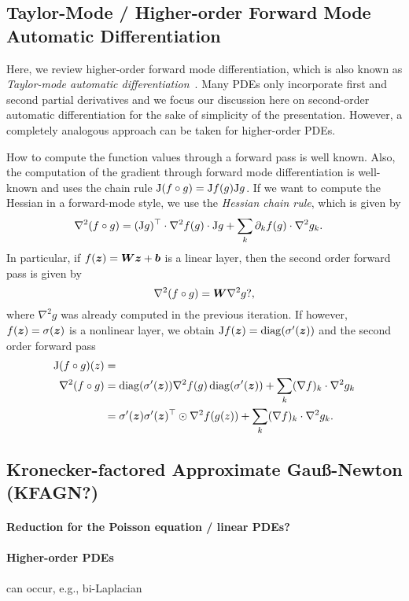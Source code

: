 \subsection{Taylor-Mode  / Higher-order Forward Mode Automatic Differentiation} \label{sec:taylor-mode-AD}

Here, we review higher-order forward mode differentiation, which is also known as \emph{Taylor-mode automatic differentiation}~\citep{griewank1996algorithm, griewank2008evaluating, bettencourt2019taylor}. 
Many PDEs only incorporate first and second partial derivatives and we focus our discussion here on second-order automatic differentiation for the sake of simplicity of the presentation. 
However, a completely analogous approach can be taken for higher-order PDEs. 

How to compute the function values through a forward pass is well known. 
Also, the computation of the gradient through forward mode differentiation is well-known and uses the chain rule $\mathrm{J} (f\circ g) = \mathrm{J} f (g) \mathrm{J} g$. 
If we want to compute the Hessian in a forward-mode style, we use the \emph{Hessian chain rule}, which is given by 
\begin{align}
       \nabla^2 (f\circ g) & = (\mathrm{J} g)^\top\cdot \nabla^2 f(g) \cdot \mathrm{J} g + \sum_{k} \partial_{k} f(g) \cdot \nabla^2 g_k. 
\end{align}
In particular, if $f({\bm{z}}) = {\bm{W}} {\bm{z}} + {\bm{b}}$ is a linear layer, then the second order forward pass is given by 
\begin{equation}
       \nabla^2 (f\circ g) = {\bm{W}}   \nabla^2 g?, 
\end{equation}
where $\nabla^2 g$ was already computed in the previous iteration. 
If however, $f({\bm{z}}) = \sigma({\bm{z}})$ is a nonlinear layer, we obtain $\mathrm{J} f({\bm{z}}) = \operatorname{diag}(\sigma'({\bm{z}}))$ and the second order forward pass 
\begin{align}
    \mathrm{J} (f\circ g)(z) & = 
    \\ 
    \nabla^2 (f\circ g) & = \operatorname{diag}(\sigma'({\bm{z}})) \nabla^2 f(g) \operatorname{diag}(\sigma'({\bm{z}})) + \sum_{k} (\nabla f)_k \cdot \nabla^2 g_k 
    \\ & = \sigma'({\bm{z}})\sigma'({\bm{z}})^\top \odot \nabla^2 f(g(z)) + \sum_{k} (\nabla f)_k \cdot \nabla^2 g_k .
\end{align}


\subsection{Kronecker-factored Approximate Gauß-Newton (KFAGN?)}\label{sec:KFAGN}



\paragraph{Reduction for the Poisson equation / linear PDEs?}

\paragraph{Higher-order PDEs}
can occur, e.g., bi-Laplacian

